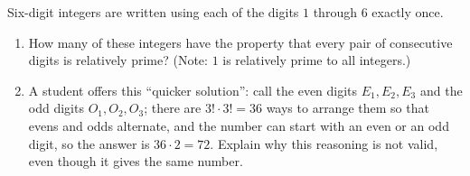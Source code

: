 Six-digit integers are written using each of the digits $1$ through $6$ exactly once.
\begin{enumerate}
\item[(a)] How many of these integers have the property that every pair of consecutive digits is relatively prime? (Note: $1$ is relatively prime to all integers.)
\item[(b)] A student offers this ``quicker solution'': call the even digits $E_1,E_2,E_3$ and the odd digits $O_1,O_2,O_3$; there are $3!\cdot3!=36$ ways to arrange them so that evens and odds alternate, and the number can start with an even or an odd digit, so the answer is $36\cdot2=72$. Explain why this reasoning is not valid, even though it gives the same number.
\end{enumerate}
